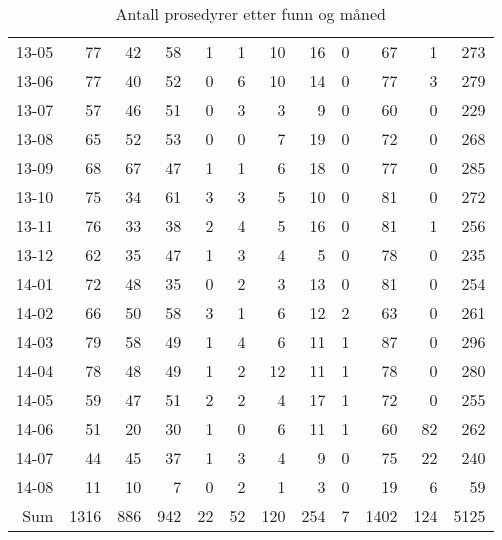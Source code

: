 \documentclass[presentation,xcolor=pdftex,dvipsnames,table]{beamer}
\begin{document}
\begin{frame}
\begin{tiny}
\begin{table}[ht]
\begin{tabular}{rrrrrrrrrrrr}
  13-05 & 77 & 42 & 58 & 1 & 1 & 10 & 16 & 0 & 67 & 1 & 273 \\ 
  13-06 & 77 & 40 & 52 & 0 & 6 & 10 & 14 & 0 & 77 & 3 & 279 \\ 
  13-07 & 57 & 46 & 51 & 0 & 3 & 3 & 9 & 0 & 60 & 0 & 229 \\ 
  13-08 & 65 & 52 & 53 & 0 & 0 & 7 & 19 & 0 & 72 & 0 & 268 \\ 
  13-09 & 68 & 67 & 47 & 1 & 1 & 6 & 18 & 0 & 77 & 0 & 285 \\ 
  13-10 & 75 & 34 & 61 & 3 & 3 & 5 & 10 & 0 & 81 & 0 & 272 \\ 
  13-11 & 76 & 33 & 38 & 2 & 4 & 5 & 16 & 0 & 81 & 1 & 256 \\ 
  13-12 & 62 & 35 & 47 & 1 & 3 & 4 & 5 & 0 & 78 & 0 & 235 \\ 
  14-01 & 72 & 48 & 35 & 0 & 2 & 3 & 13 & 0 & 81 & 0 & 254 \\ 
  14-02 & 66 & 50 & 58 & 3 & 1 & 6 & 12 & 2 & 63 & 0 & 261 \\ 
  14-03 & 79 & 58 & 49 & 1 & 4 & 6 & 11 & 1 & 87 & 0 & 296 \\ 
  14-04 & 78 & 48 & 49 & 1 & 2 & 12 & 11 & 1 & 78 & 0 & 280 \\ 
  14-05 & 59 & 47 & 51 & 2 & 2 & 4 & 17 & 1 & 72 & 0 & 255 \\ 
  14-06 & 51 & 20 & 30 & 1 & 0 & 6 & 11 & 1 & 60 & 82 & 262 \\ 
  14-07 & 44 & 45 & 37 & 1 & 3 & 4 & 9 & 0 & 75 & 22 & 240 \\ 
  14-08 & 11 & 10 & 7 & 0 & 2 & 1 & 3 & 0 & 19 & 6 & 59 \\ 
  Sum & 1316 & 886 & 942 & 22 & 52 & 120 & 254 & 7 & 1402 & 124 & 5125 \\ 
   \bottomrule
\end{tabular}
\caption{Antall prosedyrer etter funn og måned} 
\end{table}\end{tiny}
\end{frame}



\end{document}
